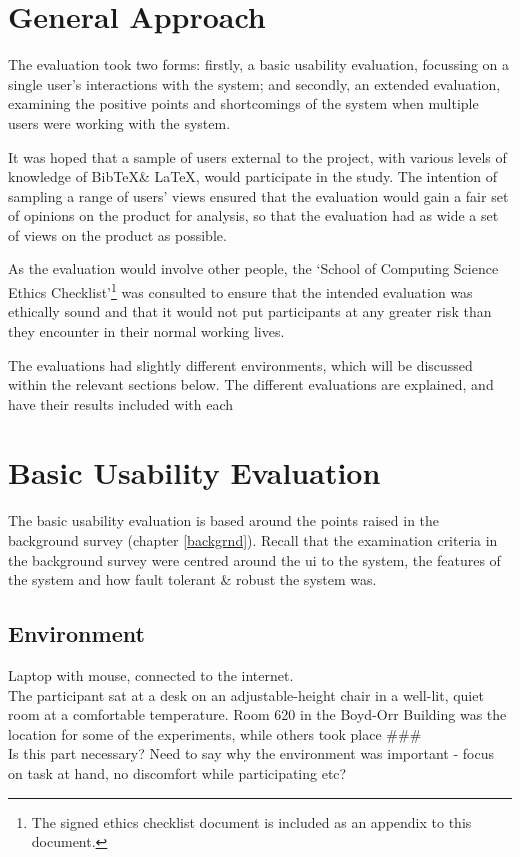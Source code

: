 \documentclass{l4proj}
\newcommand{\BibTeX}{B{\sc ib}\TeX}
\newcommand{\bibtex}{\BibTeX}
\newcommand{\revisit}{\#\#\#}
\begin{document}
\section{General Approach}
The evaluation took two forms: firstly, a basic usability evaluation, focussing on a single user's interactions with the system; and secondly, an extended evaluation, examining the positive points and shortcomings of the system when multiple users were working with the system.

It was hoped that a sample of users external to the project, with various levels of knowledge of \bibtex \& \LaTeX, would participate in the study. The intention of sampling a range of users' views ensured that the evaluation would gain a fair set of opinions on the product for analysis, so that the evaluation had as wide a set of views on the product as possible. 

As the evaluation would involve other people, the `School of Computing Science Ethics Checklist'\footnote{The signed ethics checklist document is included as an appendix to this document.} was consulted to ensure that the intended evaluation was ethically sound and that it would not put participants at any greater risk than they encounter in their normal working lives.

The evaluations had slightly different environments, which will be discussed within the relevant sections below.  The different evaluations are explained, and have their results included with each 

\section{Basic Usability Evaluation}
The basic usability evaluation is based around the points raised in the background survey (chapter \ref{backgrnd}).  Recall that the examination criteria in the background survey were centred around the \gls{ui} to the system, the features of the system and how fault tolerant \& robust the system was.

\subsection{Environment}
Laptop with mouse, connected to the internet.\\
The participant sat at a desk on an adjustable-height chair in a well-lit, quiet room at a comfortable temperature.	Room 620 in the Boyd-Orr Building was the location for some of the experiments, while others took place \revisit \\
Is this part necessary? Need to say why the environment was important - focus on task at hand, no discomfort while participating etc?
\end{document}
